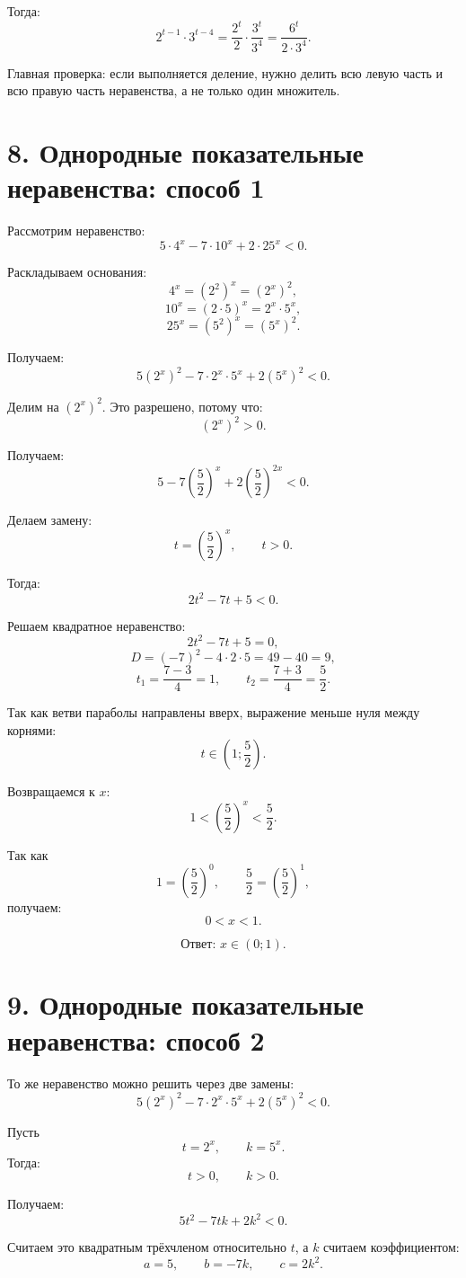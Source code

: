 \documentclass[a4paper,12pt]{article}
\newcommand{\answer}[1]{\textbf{Ответ: }#1}
\begin{document}
Тогда:
\[
2^{t-1}\cdot3^{t-4}
=
\frac{2^t}{2}\cdot\frac{3^t}{3^4}
=
\frac{6^t}{2\cdot3^4}.
\]

Главная проверка: если выполняется деление, нужно делить всю левую часть и всю правую часть неравенства, а не только один множитель.

\section*{8. Однородные показательные неравенства: способ 1}

Рассмотрим неравенство:
\[
5\cdot4^x-7\cdot10^x+2\cdot25^x<0.
\]

Раскладываем основания:
\[
4^x=(2^2)^x=(2^x)^2,
\]
\[
10^x=(2\cdot5)^x=2^x\cdot5^x,
\]
\[
25^x=(5^2)^x=(5^x)^2.
\]

Получаем:
\[
5(2^x)^2-7\cdot2^x\cdot5^x+2(5^x)^2<0.
\]

Делим на \((2^x)^2\). Это разрешено, потому что:
\[
(2^x)^2>0.
\]

Получаем:
\[
5-7\left(\frac52\right)^x+2\left(\frac52\right)^{2x}<0.
\]

Делаем замену:
\[
t=\left(\frac52\right)^x,\qquad t>0.
\]

Тогда:
\[
2t^2-7t+5<0.
\]

Решаем квадратное неравенство:
\[
2t^2-7t+5=0,
\]
\[
D=(-7)^2-4\cdot2\cdot5=49-40=9,
\]
\[
t_1=\frac{7-3}{4}=1,\qquad
t_2=\frac{7+3}{4}=\frac52.
\]

Так как ветви параболы направлены вверх, выражение меньше нуля между корнями:
\[
t\in\left(1;\frac52\right).
\]

Возвращаемся к \(x\):
\[
1<\left(\frac52\right)^x<\frac52.
\]

Так как
\[
1=\left(\frac52\right)^0,
\qquad
\frac52=\left(\frac52\right)^1,
\]
получаем:
\[
0<x<1.
\]

\[
\answer{\displaystyle x\in(0;1).}
\]

\section*{9. Однородные показательные неравенства: способ 2}

То же неравенство можно решить через две замены:
\[
5(2^x)^2-7\cdot2^x\cdot5^x+2(5^x)^2<0.
\]

Пусть
\[
t=2^x,\qquad k=5^x.
\]
Тогда:
\[
t>0,\qquad k>0.
\]

Получаем:
\[
5t^2-7tk+2k^2<0.
\]

Считаем это квадратным трёхчленом относительно \(t\), а \(k\) считаем коэффициентом:
\[
a=5,\qquad b=-7k,\qquad c=2k^2.
\]
\end{document}
